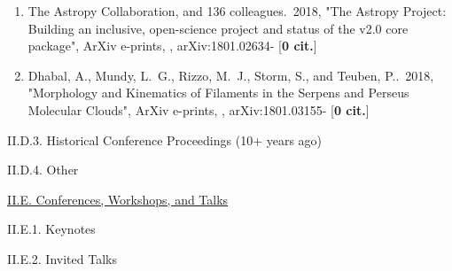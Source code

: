 \documentclass[11pt,letterpaper]{article}
\begin{document}
\begin{enumerate}[resume,label=\textbf{\arabic*}.]
\item  
The Astropy Collaboration, and 136 colleagues.\  2018,  "The Astropy 
Project: Building an inclusive, open-science project and status of the v2.0 
core package", ArXiv e-prints,  , arXiv:1801.02634- [{\bf 0 cit.}] 

\item  
Dhabal, A., Mundy, L.~G., Rizzo, M.~J., Storm, S., and Teuben, P..\  2018,  
"Morphology and Kinematics of Filaments in the Serpens and Perseus 
Molecular Clouds", ArXiv e-prints,  , arXiv:1801.03155- [{\bf 0 cit.}] 


  

\end{enumerate}



II.D.3. Historical Conference Proceedings (10+ years ago)

II.D.4. Other





\underline{II.E. Conferences, Workshops, and Talks}

II.E.1. Keynotes

II.E.2. Invited Talks
\end{document}
